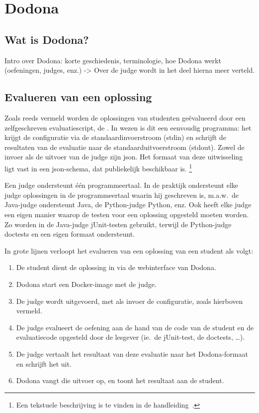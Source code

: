 \chapter{Dodona}\label{ch:dodona}

\section{Wat is Dodona?}\label{sec:wat-is-dodona}

Intro over Dodona: korte geschiedenis, terminologie, hoe Dodona werkt (oefeningen, judges, enz.)
-> Over de judge wordt in het deel hierna meer verteld.

\section{Evalueren van een oplossing}\label{sec:evalueren-van-een-oplossing}

Zoals reeds vermeld worden de oplossingen van studenten geëvalueerd door een zelfgeschreven evaluatiescript, de .
In wezen is dit een eenvoudig programma: het krijgt de configuratie via de standaardinvoerstroom (stdin) en schrijft de resultaten van de evaluatie naar de standaarduitvoerstroom (stdout).
Zowel de invoer als de uitvoer van de judge zijn json.
Het formaat van deze uitwisseling ligt vast in een json-schema, dat publiekelijk beschikbaar is.
\footnote{Een tekstuele beschrijving is te vinden in de handleiding~\cite{dodona2020}.}

Een judge ondersteunt één programmeertaal.
In de praktijk ondersteunt elke judge oplossingen in de programmeertaal waarin hij geschreven is, m.a.w.\ de Java-judge ondersteunt Java, de Python-judge Python, enz.
Ook heeft elke judge een eigen manier waarop de testen voor een oplossing opgesteld moeten worden.
Zo worden in de Java-judge jUnit-testen gebruikt, terwijl de Python-judge doctests en een eigen formaat ondersteunt.

In grote lijnen verloopt het evalueren van een oplossing van een student als volgt:

\begin{enumerate}
    \item De student dient de oplossing in via de webinterface van Dodona.
    \item Dodona start een Docker-image met de judge.
    \item De judge wordt uitgevoerd, met als invoer de configuratie, zoals hierboven vermeld.
    \item De judge evalueert de oefening aan de hand van de code van de student en de evaluatiecode opgesteld door de lesgever (ie.\ de jUnit-test, de doctests, \ldots).
    \item De judge vertaalt het resultaat van deze evaluatie naar het Dodona-formaat en schrijft het uit.
    \item Dodona vangt die uitvoer op, en toont het resultaat aan de student.
\end{enumerate}

